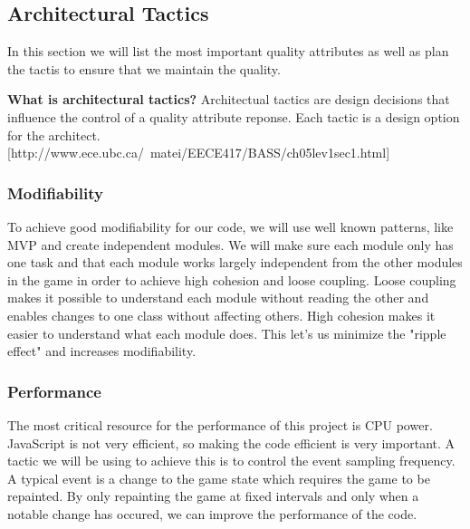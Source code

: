 \subsection{Architectural Tactics}
In this section we will list the most important quality attributes as 
well as plan the tactis to ensure that we maintain the quality.

{\bf What is architectural tactics? }
Architectual tactics are design decisions that influence the control of a quality attribute reponse. 
Each tactic is a design option for the architect. [http://www.ece.ubc.ca/~matei/EECE417/BASS/ch05lev1sec1.html]

\subsubsection{Modifiability}
To achieve good modifiability for our code, we will use well known patterns, like MVP and create 
independent modules. We will make sure each module only has one task and that each module works 
largely independent from the other modules in the game in order to achieve high cohesion and 
loose coupling. Loose coupling makes it possible to understand each module without reading the
other and enables changes to one class without affecting others. High cohesion makes it easier
to understand what each module does. This let's us minimize the "ripple effect" and increases
modifiability.

\subsubsection{Performance}
The most critical resource for the performance of this project is CPU power. JavaScript is not very 
efficient, so making the code efficient is very important. A tactic we will be using to achieve this 
is to control the event sampling frequency. A typical event is a change to the game state which 
requires the game to be repainted. By only repainting the game at fixed intervals and only when a 
notable change has occured, we can improve the performance of the code.